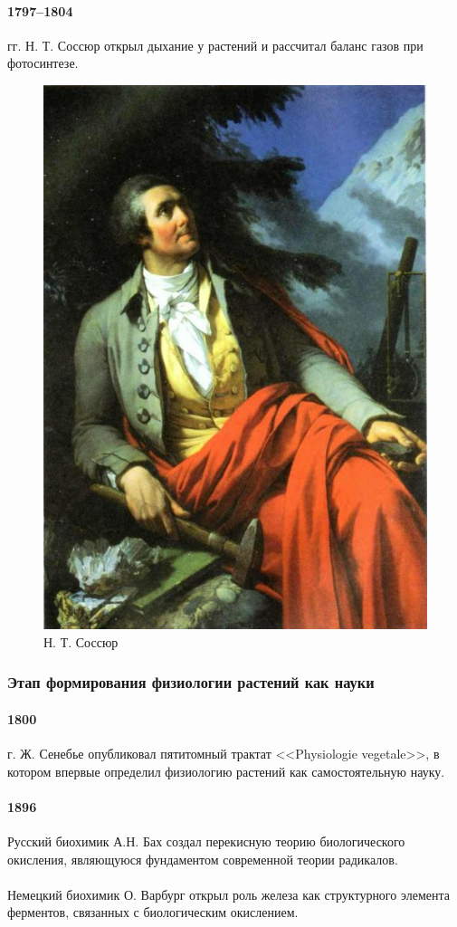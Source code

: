
\paragraph*{1797–1804} гг. Н. Т. Соссюр открыл дыхание у растений и рассчитал баланс газов при фотосинтезе. 

\begin{figure}
  \centering
       \includegraphics[width=0.35\linewidth]{pictures/saussr}
\caption{Н. Т. Соссюр}
\label{saussr}
\end{figure}

\subsubsection*{Этап формирования физиологии растений как науки}

\paragraph*{1800} г. Ж. Сенебье опубликовал пятитомный трактат <<Physiologie vegetale>>, в котором впервые определил физиологию растений как самостоятельную науку.

\paragraph*{1896} Русский биохимик А.Н. Бах создал перекисную теорию биологического окисления, являющуюся фундаментом современной теории радикалов.

\paragraph*{}Немецкий биохимик О. Варбург открыл роль железа как структурного элемента ферментов, связанных с биологическим окислением. 

